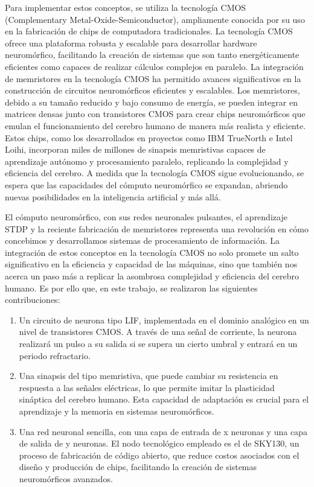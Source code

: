 \documentclass[conference]{IEEEtran}
\begin{document}
Para implementar estos conceptos, se utiliza la tecnología CMOS (Complementary Metal-Oxide-Semiconductor), ampliamente conocida por su uso en la fabricación de chips de computadora tradicionales. La tecnología CMOS ofrece una plataforma robusta y escalable para desarrollar hardware neuromórfico, facilitando la creación de sistemas que son tanto energéticamente eficientes como capaces de realizar cálculos complejos en paralelo. La integración de memristores en la tecnología CMOS ha permitido avances significativos en la construcción de circuitos neuromórficos eficientes y escalables. Los memristores, debido a su tamaño reducido y bajo consumo de energía, se pueden integrar en matrices densas junto con transistores CMOS para crear chips neuromórficos que emulan el funcionamiento del cerebro humano de manera más realista y eficiente. Estos chips, como los desarrollados en proyectos como IBM TrueNorth e Intel Loihi, incorporan miles de millones de sinapsis memristivas capaces de aprendizaje autónomo y procesamiento paralelo, replicando la complejidad y eficiencia del cerebro. A medida que la tecnología CMOS sigue evolucionando, se espera que las capacidades del cómputo neuromórfico se expandan, abriendo nuevas posibilidades en la inteligencia artificial y más allá.

El cómputo neuromórfico, con sus redes neuronales pulsantes, el aprendizaje STDP y la reciente fabricación de memristores representa una revolución en cómo concebimos y desarrollamos sistemas de procesamiento de información. La integración de estos conceptos en la tecnología CMOS no solo promete un salto significativo en la eficiencia y capacidad de las máquinas, sino que también nos acerca un paso más a replicar la asombrosa complejidad y eficiencia del cerebro humano. Es por ello que, en este trabajo, se realizaron las siguientes contribuciones:

\begin{enumerate}
    \item Un circuito de neurona tipo LIF, implementada en el dominio analógico en un nivel de transistores CMOS. A través de una señal de corriente, la neurona realizará un pulso a su salida si se supera un cierto umbral y entrará en un periodo refractario.
    \item Una sinapsis del tipo memristiva, que puede cambiar su resistencia en respuesta a las señales eléctricas, lo que permite imitar la plasticidad sináptica del cerebro humano. Esta capacidad de adaptación es crucial para el aprendizaje y la memoria en sistemas neuromórficos.
    \item Una red neuronal sencilla, con una capa de entrada de x neuronas y una capa de salida de y neuronas. El nodo tecnológico empleado es el de SKY130, un proceso de fabricación de código abierto, que reduce costos asociados con el diseño y producción de chips, facilitando la creación de sistemas neuromórficos avanzados.
\end{enumerate}
\end{document}
